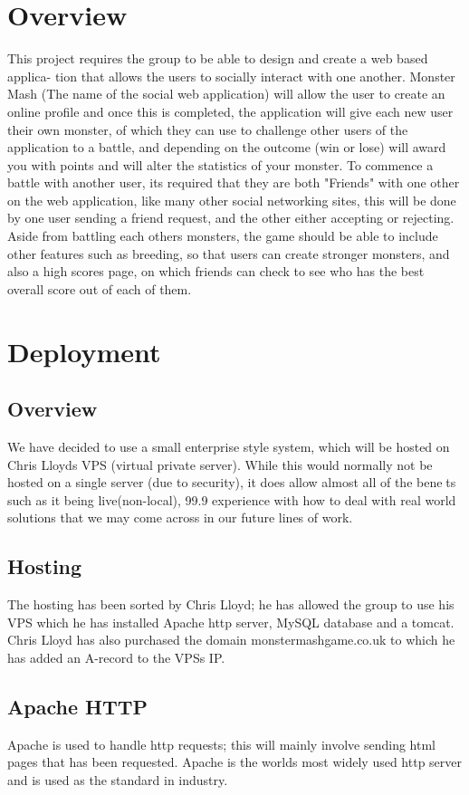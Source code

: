 \documentclass{project}
\begin{document}
\section{Overview}
This project requires the group to be able to design and create a web based applica-
tion that allows the users to socially interact with one another. Monster Mash (The
name of the social web application) will allow the user to create an online profile and
once this is completed, the application will give each new user their own monster,
of which they can use to challenge other users of the application to a battle, and
depending on the outcome (win or lose) will award you with points and will alter
the statistics of your monster.
To commence a battle with another user, its required that they are both "Friends"
with one other on the web application, like many other social networking sites, this
will be done by one user sending a friend request, and the other either accepting or
rejecting.
Aside from battling each others monsters, the game should be able to include other
features such as breeding, so that users can create stronger monsters, and also a
high scores page, on which friends can check to see who has the best overall score
out of each of them.
\section{Deployment}
\subsection{Overview}
We have decided to use a small enterprise style system, which will be hosted on
Chris Lloyds VPS (virtual private server). While this would normally not be hosted
on a single server (due to security), it does allow almost all of the benets such as it
being live(non-local), 99.9%
experience with how to deal with real world solutions that we may come across in
our future lines of work.

\subsection{Hosting}
The hosting has been sorted by Chris Lloyd; he has allowed the group to use his
VPS which he has installed Apache http server, MySQL database and a tomcat.
Chris Lloyd has also purchased the domain monstermashgame.co.uk to which he
has added an A-record to the VPSs IP.

\subsection{Apache HTTP}
Apache is used to handle http requests; this will mainly involve sending html pages
that has been requested. Apache is the worlds most widely used http server and is
used as the standard in industry.
\end{document}
